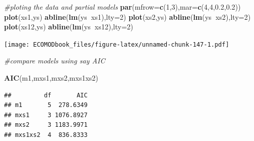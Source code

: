 \documentclass[
]{book}
\newenvironment{Shaded}{\begin{snugshade}}{\end{snugshade}}
\newcommand{\CommentTok}[1]{\textcolor[rgb]{0.56,0.35,0.01}{\textit{#1}}}
\newcommand{\DataTypeTok}[1]{\textcolor[rgb]{0.13,0.29,0.53}{#1}}
\newcommand{\DecValTok}[1]{\textcolor[rgb]{0.00,0.00,0.81}{#1}}
\newcommand{\FloatTok}[1]{\textcolor[rgb]{0.00,0.00,0.81}{#1}}
\newcommand{\KeywordTok}[1]{\textcolor[rgb]{0.13,0.29,0.53}{\textbf{#1}}}
\newcommand{\NormalTok}[1]{#1}
\newcommand{\OperatorTok}[1]{\textcolor[rgb]{0.81,0.36,0.00}{\textbf{#1}}}
\begin{document}
\begin{Shaded}
\begin{Highlighting}[]
\CommentTok{#ploting the data and partial models}
\KeywordTok{par}\NormalTok{(}\DataTypeTok{mfrow=}\KeywordTok{c}\NormalTok{(}\DecValTok{1}\NormalTok{,}\DecValTok{3}\NormalTok{),}\DataTypeTok{mar=}\KeywordTok{c}\NormalTok{(}\DecValTok{4}\NormalTok{,}\DecValTok{4}\NormalTok{,}\FloatTok{0.2}\NormalTok{,}\FloatTok{0.2}\NormalTok{))}
\KeywordTok{plot}\NormalTok{(xs1,ys)}
\KeywordTok{abline}\NormalTok{(}\KeywordTok{lm}\NormalTok{(ys}\OperatorTok{~}\NormalTok{xs1),}\DataTypeTok{lty=}\DecValTok{2}\NormalTok{)}
\KeywordTok{plot}\NormalTok{(xs2,ys)}
\KeywordTok{abline}\NormalTok{(}\KeywordTok{lm}\NormalTok{(ys}\OperatorTok{~}\NormalTok{xs2),}\DataTypeTok{lty=}\DecValTok{2}\NormalTok{)}
\KeywordTok{plot}\NormalTok{(xs12,ys)}
\KeywordTok{abline}\NormalTok{(}\KeywordTok{lm}\NormalTok{(ys}\OperatorTok{~}\NormalTok{xs12),}\DataTypeTok{lty=}\DecValTok{2}\NormalTok{)}
\end{Highlighting}
\end{Shaded}

\texttt{[image: ECOMODbook\_files/figure-latex/unnamed-chunk-147-1.pdf]}

\begin{Shaded}
\begin{Highlighting}[]
\CommentTok{#compare models using say AIC}

\KeywordTok{AIC}\NormalTok{(m1,mxs1,mxs2,mxs1xs2)}
\end{Highlighting}
\end{Shaded}

\begin{verbatim}
##         df       AIC
## m1       5  278.6349
## mxs1     3 1076.8927
## mxs2     3 1183.9971
## mxs1xs2  4  836.8333
\end{verbatim}
\end{document}
